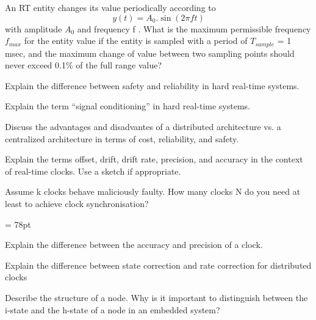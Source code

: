 

An RT entity changes its value periodically according to 
\begin{displaymath} 
y(t) = A_{0}.\sin(2\pi ft) 
\end{displaymath} 
with amplitude $A_{0}$ and frequency f . What is the maximum permissible frequency $f_{max}$ for the entity value if the entity is sampled with a period of $T_{sample}$ = 1 msec, and the maximum change of value
between two sampling points should never exceed 0.1\% of the full range value?



Explain the difference between safety and reliability in hard real-time systems.


Explain the term “signal conditioning” in hard real-time systems.


Discuss the advantages and disadvantes of a distributed architecture vs. a centralized
architecture in terms of cost, reliability, and safety.



Explain the terms offset, drift, drift rate, precision, and accuracy in the context of real-time
clocks. Use a sketch if appropriate.


 Assume k clocks behave maliciously faulty. How many clocks N do you need at least to
achieve clock synchronisation?

\pagebreak
\headheight = 78pt


Explain the difference between the accuracy and precision of a clock.


 Explain the difference between state correction and rate correction for distributed clocks


Describe the structure of a node. Why is it important to distinguish between the i-state and
the h-state of a node in an embedded system?

